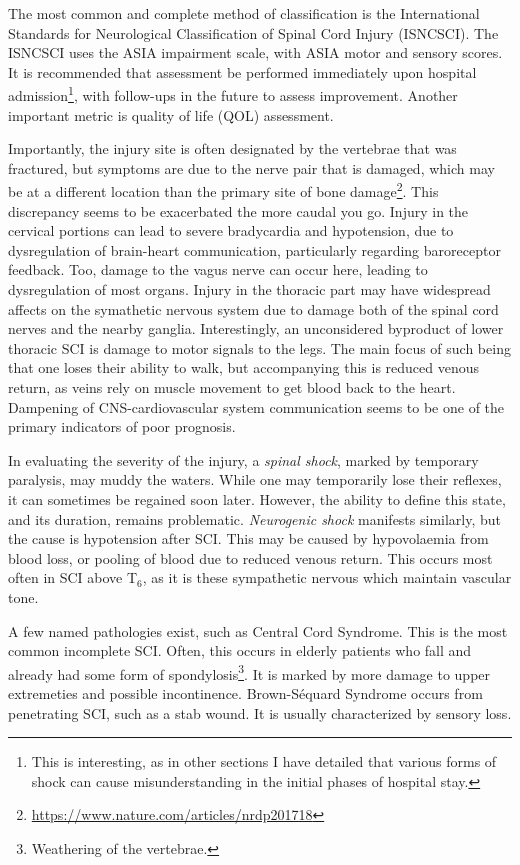 \documentclass[12pt]{report}
\begin{document}
The most common and complete method of classification is the International Standards for Neurological Classification of Spinal Cord Injury (ISNCSCI). The ISNCSCI uses the ASIA impairment scale, with ASIA motor and sensory scores. It is recommended that assessment be performed immediately upon hospital admission\footnote{This is interesting, as in other sections I have detailed that various forms of shock can cause misunderstanding in the initial phases of hospital stay.}, with follow-ups in the future to assess improvement. Another important metric is quality of life (QOL) assessment. 

Importantly, the injury site is often designated by the vertebrae that was fractured, but symptoms are due to the nerve pair that is damaged, which may be at a different location than the primary site of bone damage\footnote{\url{https://www.nature.com/articles/nrdp201718}}. This discrepancy seems to be exacerbated the more caudal you go. Injury in the cervical portions can lead to severe bradycardia and hypotension, due to dysregulation of brain-heart communication, particularly regarding baroreceptor feedback. Too, damage to the vagus nerve can occur here, leading to dysregulation of most organs. Injury in the thoracic part may have widespread affects on the symathetic nervous system due to damage both of the spinal cord nerves and the nearby ganglia. Interestingly, an unconsidered byproduct of lower thoracic SCI is damage to motor signals to the legs. The main focus of such being that one loses their ability to walk, but accompanying this is reduced venous return, as veins rely on muscle movement to get blood back to the heart. Dampening of CNS-cardiovascular system communication seems to be one of the primary indicators of poor prognosis.\newline

In evaluating the severity of the injury, a \textit{spinal shock}, marked by temporary paralysis, may muddy the waters. While one may temporarily lose their reflexes, it can sometimes be regained soon later. However, the ability to define this state, and its duration, remains problematic. \textit{Neurogenic shock} manifests similarly, but the cause is hypotension after SCI. This may be caused by hypovolaemia from blood loss, or pooling of blood due to reduced venous return. This occurs most often in SCI above T$_6$, as it is these sympathetic nervous which maintain vascular tone.\newline

A few named pathologies exist, such as Central Cord Syndrome. This is the most common incomplete SCI. Often, this occurs in elderly patients who fall and already had some form of spondylosis\footnote{Weathering of the vertebrae.}. It is marked by more damage to upper extremeties and possible incontinence. Brown-Séquard Syndrome occurs from penetrating SCI, such as a stab wound. It is usually characterized by sensory loss. 
\end{document}
